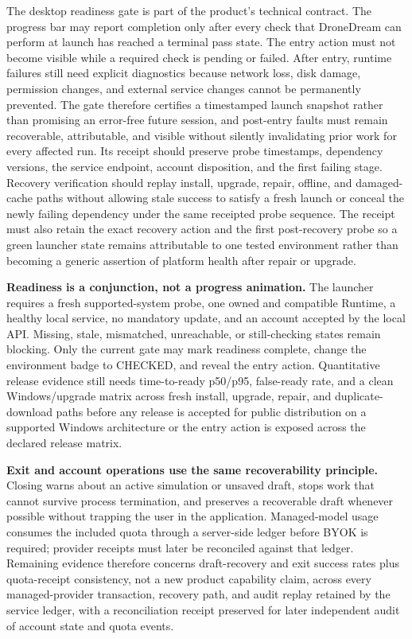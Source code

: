 The desktop readiness gate is part of the product's technical contract.
The progress bar may report completion only after every check that DroneDream
can perform at launch has reached a terminal pass state. The entry
action must not become visible while a required check is pending or
failed. After entry, runtime failures still need explicit diagnostics
because network loss, disk damage, permission changes, and external
service changes cannot be permanently prevented. The gate therefore
  certifies a timestamped launch snapshot rather than promising an
  error-free future session, and post-entry faults must remain recoverable,
  attributable, and visible without silently invalidating prior work for
  every affected run. Its receipt should preserve probe timestamps,
  dependency versions, the service endpoint, account disposition, and the
  first failing stage. Recovery verification should replay install,
  upgrade, repair, offline, and damaged-cache paths without allowing stale
  success to satisfy a fresh launch or conceal the newly failing
  dependency under the same receipted probe sequence. The receipt must
  also retain the exact recovery action and the first post-recovery probe
  so a green launcher state remains attributable to one tested
  environment rather than becoming a generic assertion of platform
  health after repair or upgrade.

\textbf{Readiness is a conjunction, not a progress animation.} The
launcher requires a fresh supported-system probe, one owned and
compatible Runtime, a healthy local service, no mandatory update, and an
account accepted by the local API. Missing, stale, mismatched,
unreachable, or still-checking states remain blocking. Only the current
gate may mark readiness complete, change the environment badge to CHECKED,
and reveal the entry action. Quantitative release evidence still needs
time-to-ready
p50/p95, false-ready rate, and a clean Windows/upgrade matrix across
fresh install, upgrade, repair, and duplicate-download paths before any
release is accepted for public distribution on a supported Windows
architecture or the entry action is exposed across the declared release
matrix.

\textbf{Exit and account operations use the same recoverability
principle.} Closing warns about an active simulation or unsaved draft,
stops work that cannot survive process termination, and preserves a
recoverable draft whenever possible without trapping the user in the
application. Managed-model usage consumes the included quota through a
server-side ledger before BYOK is required; provider receipts must later
be reconciled against that ledger. Remaining evidence therefore concerns
draft-recovery and exit success rates plus quota-receipt consistency,
not a new product capability claim, across every managed-provider
transaction, recovery path, and audit replay retained by the service
ledger, with a reconciliation receipt preserved for later independent
audit of account state and quota events.

